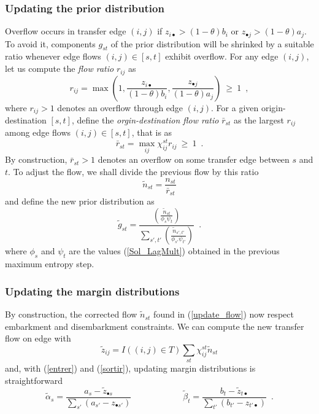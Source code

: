 \documentclass{bmcart}
\begin{document}
\subsubsection{Updating the prior distribution}
\label{priorup}
Overflow occurs in transfer edge $(i, j)$ if  $z_{i \bullet} > (1 - \theta)b_i$ or $z_{\bullet j} > (1 - \theta)a_j$. To avoid it, components $g_{st}$ of the prior distribution will be shrinked by a suitable ratio whenever edge flows $(i,j)\in [s,t]$ exhibit overflow. 
For any edge $(i, j)$, let us compute the \emph{flow ratio} $r_{ij}$ as
\begin{equation}
	r_{ij} = \max \left(1, \frac{z_{i \bullet}}{(1 - \theta)b_i}, \frac{z_{\bullet j}}{(1 - \theta)a_j} \right)\: \ge\: 1\enspace, \label{flow_ratio}
\end{equation}
where $r_{ij} > 1$ denotes an overflow through edge $(i, j)$. For a given origin-destination $[s,t]$, define the \emph{orgin-destination flow ratio} $\bar{r}_{st}$ 
as the largest $r_{ij}$ among edge flows $(i,j)\in [s,t]$, that is as 
\begin{equation}
	\label{st_flow_ratio}
	\bar{r}_{st} = \max_{ij} \chi_{ij}^{st} r_{ij}\: \ge\: 1\enspace.
\end{equation}
By construction, $\bar{r}_{st} > 1$ denotes an overflow on some transfer edge between $s$ and $t$. To adjust the flow, we shall divide the previous flow by this ratio
\begin{equation}
	\label{update_flow}
	\widetilde{n}_{st} =\frac{n_{st}}{\bar{r}_{st}}
\end{equation}
and define the new prior distribution as
\begin{equation}
	\label{update_distrib}
	\widetilde{g}_{st} = \frac{\left( \frac{\widetilde{n}_{st}}{\phi_s \psi_t} \right)}{\sum_{s',t'} \left( \frac{\widetilde{n}_{s',t'}}{\phi_{s'} \psi_{t'}} \right)}\enspace. 
\end{equation}
where $\phi_s$ and $\psi_t$ are the values (\ref{Sol_LagMult}) obtained in the previous maximum entropy step. 

\subsubsection{Updating the margin distributions}
\label{marginup}

By construction, the corrected flow $\widetilde{n}_{st}$ found in (\ref{update_flow}) now respect embarkment and disembarkment constraints. We can compute the new transfer flow on edge with
\begin{equation}
\widetilde{z}_{ij} = I((i,j) \in T)\sum_{st} \chi_{ij}^{st} \widetilde{n}_{st}
\end{equation}
and, with (\ref{entrer}) and (\ref{sortir}), updating margin distributions is straightforward 
\begin{equation}
\label{alpha_beta_update}
\widetilde{\alpha}_s = \frac{a_s - \widetilde{z}_{\bullet s}}{\sum_{s'} (a_{s'} - z_{\bullet {s'}})}   \qquad \qquad \qquad
	\widetilde{\beta}_t = \frac{b_t - \widetilde{z}_{t \bullet}}{\sum_{t'} (b_{t'} - z_{{t'} \bullet})}  \enspace. 
\end{equation}
\end{document}
